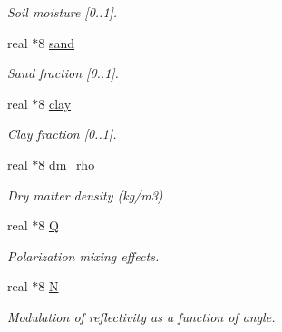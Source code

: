 \begin{DoxyCompactItemize}
\begin{DoxyCompactList}\small\item\em Soil moisture \mbox{[}0..1\mbox{]}. \end{DoxyCompactList}\item 
\hypertarget{typemod__soil_1_1soilparams_ad50fa95e7a372fa03d9197d03f7ac284}{
real $\ast$8 \hyperlink{typemod__soil_1_1soilparams_ad50fa95e7a372fa03d9197d03f7ac284}{sand}}
\label{typemod__soil_1_1soilparams_ad50fa95e7a372fa03d9197d03f7ac284}

\begin{DoxyCompactList}\small\item\em Sand fraction \mbox{[}0..1\mbox{]}. \end{DoxyCompactList}\item 
\hypertarget{typemod__soil_1_1soilparams_aa952265c95ca18956ceee9e3acca4f53}{
real $\ast$8 \hyperlink{typemod__soil_1_1soilparams_aa952265c95ca18956ceee9e3acca4f53}{clay}}
\label{typemod__soil_1_1soilparams_aa952265c95ca18956ceee9e3acca4f53}

\begin{DoxyCompactList}\small\item\em Clay fraction \mbox{[}0..1\mbox{]}. \end{DoxyCompactList}\item 
\hypertarget{typemod__soil_1_1soilparams_a684a896033feec22aea18b0ae228faa5}{
real $\ast$8 \hyperlink{typemod__soil_1_1soilparams_a684a896033feec22aea18b0ae228faa5}{dm\_\-rho}}
\label{typemod__soil_1_1soilparams_a684a896033feec22aea18b0ae228faa5}

\begin{DoxyCompactList}\small\item\em Dry matter density (kg/m3) \end{DoxyCompactList}\item 
\hypertarget{typemod__soil_1_1soilparams_afea41ec6e00a7352bc26f9a931b3bd0a}{
real $\ast$8 \hyperlink{typemod__soil_1_1soilparams_afea41ec6e00a7352bc26f9a931b3bd0a}{Q}}
\label{typemod__soil_1_1soilparams_afea41ec6e00a7352bc26f9a931b3bd0a}

\begin{DoxyCompactList}\small\item\em Polarization mixing effects. \end{DoxyCompactList}\item 
\hypertarget{typemod__soil_1_1soilparams_a43cf4ef29c31920e20447804c917473e}{
real $\ast$8 \hyperlink{typemod__soil_1_1soilparams_a43cf4ef29c31920e20447804c917473e}{N}}
\label{typemod__soil_1_1soilparams_a43cf4ef29c31920e20447804c917473e}

\begin{DoxyCompactList}\small\item\em Modulation of reflectivity as a function of angle. \end{DoxyCompactList}\end{DoxyCompactItemize}


